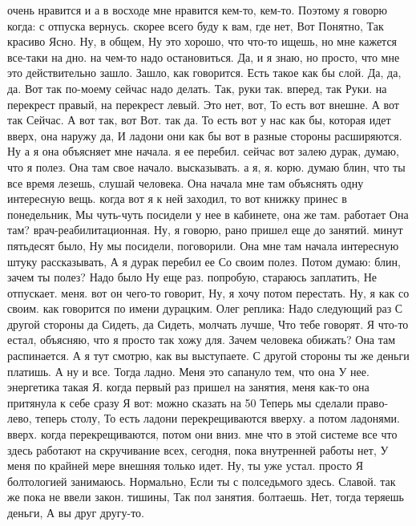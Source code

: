 очень нравится и
а в восходе мне нравится кем-то, кем-то. Поэтому я говорю когда:
с отпуска вернусь.
скорее всего буду к вам, где нет, Вот Понятно, Так красиво Ясно. Ну, в общем,
Ну это хорошо, что что-то ищешь, но мне кажется все-таки на дно. на чем-то надо остановиться.
Да, и я знаю, но просто, что мне это действительно зашло.
Зашло, как говорится.
Есть такое как бы слой.
Да, да, да.
Вот так по-моему сейчас надо делать.
Так, руки так.
вперед, так Руки.
на перекрест правый, на перекрест левый. Это нет, вот, То есть вот внешне. А вот так Сейчас.
А вот так, вот Вот.
так да. То есть вот у нас как бы, которая идет вверх, она наружу да, И ладони они как бы вот в разные стороны расширяются.
Ну а я она объясняет мне начала. я ее перебил. сейчас вот залею дурак, думаю, что я полез. Она там свое начало.
высказывать. а я, я.
корю. думаю блин, что ты все время лезешь, слушай человека. Она начала мне там объяснять одну интересную вещь. когда вот я к ней заходил, то вот книжку принес в понедельник, Мы чуть-чуть посидели у нее в кабинете, она же там.
работает Она там?
врач-реабилитационная. Ну, я говорю, рано пришел еще до занятий.
минут пятьдесят было, Ну мы
посидели, поговорили. Она мне там начала интересную штуку рассказывать, А я дурак перебил ее Со своим полез. Потом думаю: блин, зачем ты полез? Надо было Ну еще раз.
попробую, стараюсь заплатить, Не отпускает.
меня. вот он чего-то говорит, Ну, я хочу потом перестать. Ну, я как со своим.
как говорится по имени дурацким.
Олег реплика: Надо следующий раз С другой стороны да Сидеть, да Сидеть, молчать лучше, Что тебе говорят. Я что-то естал, объясняю, что я просто так хожу для.
Зачем человека обижать? Она там распинается.
А я тут смотрю, как вы выступаете. С другой стороны ты же деньги платишь. А ну и все. Тогда ладно. Меня это сапануло тем, что она У нее.
энергетика такая Я. когда первый раз пришел на занятия, меня как-то она притянула к себе сразу Я вот:
можно сказать на 50%
Теперь мы сделали право-лево, теперь столу, То есть ладони перекрещиваются вверху.
а потом ладонями.
вверх. когда перекрещиваются, потом они вниз.
мне что в этой системе все что здесь работают на скручивание всех,
сегодня, пока внутренней работы нет, У меня по крайней мере внешняя только идет. Ну, ты уже устал. просто Я болтологией занимаюсь. Нормально, Если
ты с полседьмого здесь.
Славой. так же пока не ввели закон.
тишины, Так пол занятия.
болтаешь. Нет, тогда теряешь деньги, А вы друг другу-то.

